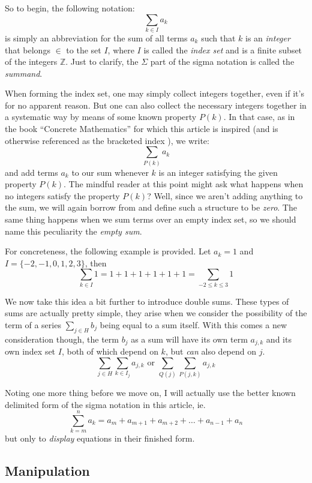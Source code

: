 \documentclass[twoside]{article}
\begin{document}
So to begin, the following notation: 
$$  \sum_{k\in I}a_k  $$ is simply an abbreviation for the sum 
of all terms $  a_k  $ such that $  k  $ is an \emph{integer} 
that belongs $  \in  $ to the set $  I  $, where $  I  $ is 
called the \emph{index set} and is a finite subset of the 
integers $  \mathbb{Z}  $.  Just to clarify, the $  \Sigma  $ part of 
the sigma notation is called the \emph{summand}.

When forming the index set, one may simply collect integers
together, even if it's for no apparent reason.  But
one can also collect the necessary integers together in a
systematic way by means of some known property $  P(k)  $.
In that case, as in the book ``Concrete Mathematics''
for which this article is inspired (and is otherwise referenced
as the bracketed index \cite{gkp}), we write:
$$  \sum_{P(k)}a_k   $$ and add terms $  a_k  $ to our sum 
whenever $  k  $ is an integer satisfying the given property 
$  P(k)  $.  The mindful reader at this point might ask what 
happens when no integers satisfy the property $  P(k)  $?  
Well, since we aren't adding anything to the sum, we will 
again borrow from \cite{gkp} and define such a structure to 
be \emph{zero}.  The same thing happens when we sum terms over 
an empty index set, so we should name this peculiarity the 
\emph{empty sum}.

For concreteness, the following example is provided.  Let 
$  a_k=1  $ and $  I=\{ -2,-1,0,1,2,3\}  $, then
$$  \sum_{k\in I}1=1+1+1+1+1+1=\sum_{-2\le k\le 3}\!\!\!\! 1  $$

We now take this idea a bit further to introduce double sums.  
These types of sums are actually pretty simple, they arise 
when we consider the possibility of the term of a series
$  \sum_{j\in H}b_j  $ being equal to a sum itself.  With this 
comes a new consideration though, the term $  b_j  $ as a sum
will have its own term $  a_{j,k}  $ and its own index set 
$  I  $, both of which depend on $  k  $, but \emph{can} also 
depend on $  j  $.
$$  \sum_{j\in H}\sum_{k\in I_j}\!a_{j,k}
\mbox{\ \ \ or\ \ \ }\sum_{Q(j)}\sum_{P(j,k)}\!\! a_{j,k}  $$

Noting one more thing before we move on, I will actually use 
the better known delimited form of the sigma notation in this 
article, ie. 
$$  \sum_{k=m}^na_k=a_m+a_{m+1}+a_{m+2}+\ldots +a_{n-1}+a_n  $$
but only to \emph{display} equations in 
their finished form.

\subsection{Manipulation}
\end{document}
